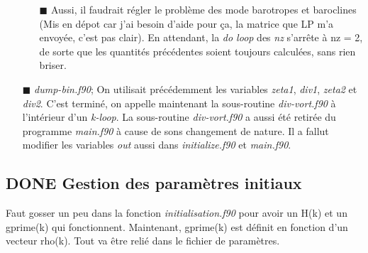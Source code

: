 \documentclass[10pt]{article}
\numberwithin{equation}{section}
\renewcommand{\boxtimes}{\blacksquare}
\begin{document}
\begin{itemize}
\begin{itemize}
\item[{$\boxtimes$}] Aussi, il faudrait régler le problème des mode barotropes et baroclines (Mis en dépot car j'ai besoin d'aide pour ça, la matrice que LP m'a envoyée, c'est pas clair).
En attendant, la \emph{do loop} des \emph{nz} s'arrête à nz = 2, de sorte que les quantités précédentes soient toujours calculées, sans rien briser.
\end{itemize}
\item[{$\boxtimes$}] \emph{dump-bin.f90}; On utilisait précédemment les variables \emph{zeta1}, \emph{div1}, \emph{zeta2} et \emph{div2}. C'est terminé, on appelle maintenant la sous-routine \emph{div-vort.f90} à l'intérieur d'un \emph{k-loop}. La sous-routine \emph{div-vort.f90} a aussi été retirée du programme \emph{main.f90} à cause de sons changement de nature. Il a fallut modifier les variables \emph{out} aussi dans \emph{initialize.f90} et \emph{main.f90}.
\end{itemize}
\subsection{{\bfseries\sffamily DONE} Gestion des paramètres initiaux}
\label{sec:org452ff33}
Faut gosser un peu dans la fonction \emph{initialisation.f90} pour avoir un H(k) et un gprime(k) qui fonctionnent.
Maintenant, gprime(k) est définit en fonction d'un vecteur rho(k). 
Tout va être relié dans le fichier de paramètres.

\printbibliography
\end{document}
